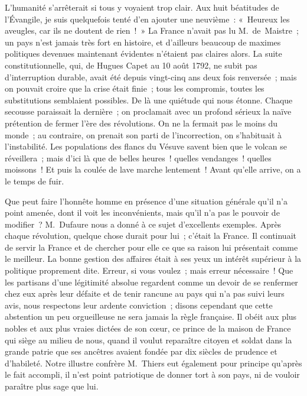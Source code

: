 \documentclass[french,twoside]{book} %
\newcommand\orgName[1]{#1}
\newcommand\persName[1]{#1}
\newcommand\placeName[1]{#1}
\begin{document}
L’humanité s’arrêterait si tous y voyaient trop clair. Aux huit béatitudes de l’Évangile, je suis quelquefois tenté d’en ajouter une neuvième : « Heureux les aveugles, car ils ne doutent de rien ! » La {\orgName France} n’avait pas lu {\persName M. de Maistre} ; un pays n’est jamais très fort en histoire, et d’ailleurs beaucoup de maximes politiques devenues maintenant évidentes n’étaient pas claires alors. La suite constitutionnelle, qui, de {\persName Hugues Capet} au 10 août 1792, ne subit pas d’interruption durable, avait été depuis vingt-cinq ans deux fois renversée ; mais on pouvait croire que la crise était finie ; tous les compromis, toutes les substitutions semblaient possibles. De là une quiétude qui nous étonne. Chaque secousse paraissait la dernière ; on proclamait avec un profond sérieux la naïve prétention de fermer l’ère des révolutions. On ne la fermait pas le moins du monde ; au contraire, on prenait son parti de l’incorrection, on s’habituait à l’instabilité. Les populations des flancs du {\placeName Vésuve} savent bien que le volcan se réveillera ; mais d’ici là que de belles heures ! quelles vendanges ! quelles moissons ! Et puis la coulée de lave marche lentement ! Avant qu’elle arrive, on a le temps de fuir.\par
Que peut faire l’honnête homme en présence d’une situation générale qu’il n’a point amenée, dont il voit les inconvénients, mais qu’il n’a pas le pouvoir de modifier ? {\persName M. Dufaure} nous a donné à ce sujet d’excellents exemples. Après chaque révolution, quelque chose durait pour lui ; c’était la {\orgName France}. Il continuait de servir la {\orgName France} et de chercher pour elle ce que sa raison lui présentait comme le meilleur. La bonne gestion des affaires était à ses yeux un intérêt supérieur à la politique proprement dite. Erreur, si vous voulez ; mais erreur nécessaire ! Que les partisans d’une légitimité absolue regardent comme un devoir de se renfermer chez eux après leur défaite et de tenir rancune au pays qui n’a pas suivi leurs avis, nous respectons leur ardente conviction ; disons cependant que cette abstention un peu orgueilleuse ne sera jamais la règle française. Il obéit aux plus nobles et aux plus vraies dictées de son cœur, ce prince de la {\orgName maison de France} qui siège au milieu de nous, quand il voulut reparaître citoyen et soldat dans la grande patrie que ses ancêtres avaient fondée par dix siècles de prudence et d’habileté. Notre illustre confrère {\persName M. Thiers }eut également pour principe qu’après le fait accompli, il n’est point patriotique de donner tort à son pays, ni de vouloir paraître plus sage que lui.\par
\end{document}
